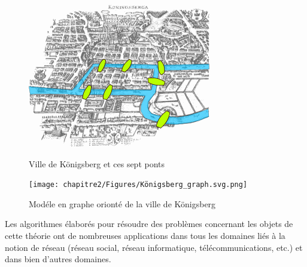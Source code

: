 \begin{figure}[H]  
  \centering
    \includegraphics[width=0.4 \textwidth]{chapitre2/Figures/Konigsberg_bridges.png}
  \caption{Ville de Königsberg et ces sept ponts}
  \centering
    \texttt{[image: chapitre2/Figures/Königsberg\_graph.svg.png]}
  \caption{Modéle en graphe orionté de la ville de Königsberg}
\end{figure}

Les algorithmes élaborés pour résoudre des problèmes concernant les objets de cette théorie ont de nombreuses applications dans tous les domaines liés à la notion de réseau (réseau social, réseau informatique, télécommunications, etc.) et dans bien d'autres domaines.